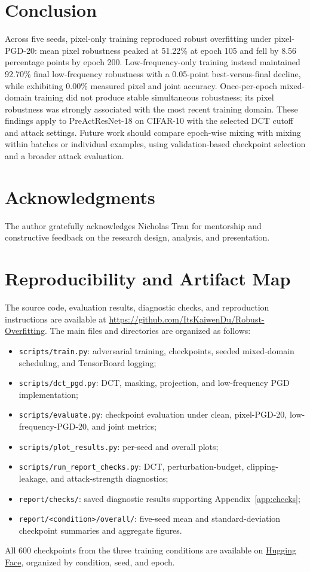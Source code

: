 \documentclass{article}
\begin{document}
\section{Conclusion}
\label{sec:conclusion}
Across five seeds, pixel-only training reproduced robust overfitting under
pixel-PGD-20: mean pixel robustness peaked at 51.22\% at epoch 105 and fell
by 8.56 percentage points by epoch 200. Low-frequency-only training instead
maintained 92.70\% final low-frequency robustness with a 0.05-point
best-versus-final decline, while exhibiting 0.00\% measured pixel and
joint accuracy. Once-per-epoch mixed-domain training did not produce
stable simultaneous robustness; its pixel robustness was strongly associated
with the most recent training domain. These findings apply to PreActResNet-18 on CIFAR-10 with the selected DCT
cutoff and attack settings. Future work should compare epoch-wise mixing
with mixing within batches or individual examples, using validation-based
checkpoint selection and a broader attack evaluation.

\section*{Acknowledgments}
The author gratefully acknowledges Nicholas Tran for mentorship and
constructive feedback on the research design, analysis, and presentation.

\section*{Reproducibility and Artifact Map}
The source code, evaluation results, diagnostic checks, and reproduction
instructions are available at
\url{https://github.com/ItsKaiwenDu/Robust-Overfitting}.
The main files and directories are organized as follows:
\begin{itemize}
  \item \texttt{scripts/train.py}: adversarial training, checkpoints, seeded
  mixed-domain scheduling, and TensorBoard logging;
  \item \texttt{scripts/dct\_pgd.py}: DCT, masking, projection, and
  low-frequency PGD implementation;
  \item \texttt{scripts/evaluate.py}: checkpoint evaluation under clean,
  pixel-PGD-20, low-frequency-PGD-20, and joint metrics;
  \item \texttt{scripts/plot\_results.py}: per-seed and overall plots;
  \item \texttt{scripts/run\_report\_checks.py}: DCT, perturbation-budget,
  clipping-leakage, and attack-strength diagnostics;
  \item \texttt{report/checks/}: saved diagnostic results supporting Appendix~\ref{app:checks};
  \item \texttt{report/<condition>/overall/}: five-seed mean and
  standard-deviation checkpoint summaries and aggregate figures.
\end{itemize}
All 600 checkpoints from the three training conditions are available on
\href{https://huggingface.co/KaiwenDu/robust-overfitting-checkpoints}{Hugging Face},
organized by condition, seed, and epoch.
\end{document}
